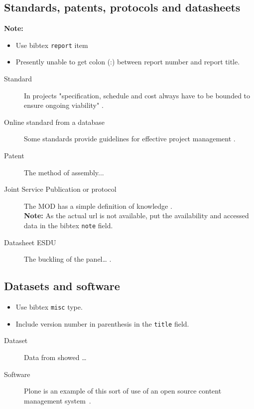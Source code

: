 \subsection{Standards, patents, protocols and datasheets}
\label{sec:standards}
\textbf{Note:} 
\begin{itemize}
\item Use bibtex \texttt{report} item
\item Presently unable to get colon (:) between report number and report title.
\end{itemize}
\begin{description}
\item[Standard] In projects "specification, schedule and
cost always have to be bounded to ensure
ongoing viability" \cite{british_standards_institution_project_2010}.
\item[Online standard from a database] Some standards provide guidelines for effective project management \cite{british_standards_institution_project_2010}.
\item[Patent] The method of assembly... \cite{hodge_rear_2008}
\item[Joint Service Publication or protocol] The MOD has a simple definition of knowledge \cite{great_britain_ministry_of_defence_retaining_2011}.\\
\textbf{Note:} As the actual url is not available, put the availability and accessed data in the bibtex \texttt{note} field.
\item[Datasheet \eg ESDU] The buckling of the panel… \cite{esdu_elastic_2008}.
\end{description}

\subsection{Datasets and software}
\label{sec:datasets}
\begin{itemize}
\item Use bibtex \texttt{misc} type.
\item Include version number in parenthesis in the \texttt{title} field.
\end{itemize}
\begin{description}
\item[Dataset] Data from \textcite{partridge_spectra_2014} showed \ldots
\item[Software] Plone is an example of this sort of use
of an open source content management
system~\cite{plone_foundation_plone_2016}.
\end{description}

